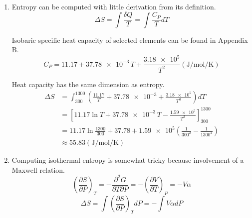 \begin{@empty}
\begin{problem}
\end{problem}

\begin{answer}
    \begin{enumerate}
        \item Entropy can be computed with little derivation from its
            definition.
            \[ \Delta S = \int \frac{\delta Q}{T} = \int \frac{C_P}{T} dT \]

            Isobaric specific heat capacity of selected elements can be found
            in Appendix B.
            \[ C_P = 11.17 + \num{37.78e-3}\,T + \frac{\num{3.18e5}}{T^2} \left( \si{\joule\per\mol\per\kelvin} \right) \]

            Heat capacity has the same dimension as entropy.
            \begin{align*}
                \Delta S &= \int_{300}^{1300} \left( \frac{11.17}{T} + \num{37.78e-3} + \frac{\num{3.18e5}}{T^3} \right) dT \\
                    &= \left[ 11.17 \ln T + \num{37.78e-3}\, T - \frac{\num{1.59e5}}{T^2} \right]_{300}^{1300} \\
                    &= 11.17 \ln \frac{1300}{300} + 37.78
                        + \num{1.59e5} \left( \frac{1}{300^2} - \frac{1}{1300^2} \right) \\
                    &\approx 55.83 \left( \si{\joule\per\mol\per\kelvin} \right)
            \end{align*}

        \item Computing isothermal entropy is somewhat tricky because
            involvement of a Maxwell relation.
            \[
                \left( \frac{\partial S}{\partial P} \right)_T
                = -\frac{\partial^2 G}{\partial T \partial P}
                = -\left( \frac{\partial V}{\partial T} \right)_P
                = -V \alpha
            \]
            \[ \Delta S = \int \left( \frac{\partial S}{\partial P} \right)_T dP = -\int V \alpha dP \]

            \begin{@empty}
                \newcommand{\stdT}{\SI{298}{\kelvin}}
                \newcommand{\stdP}{\SI{1}{\atm}}
                \newcommand{\thisa}{\SI{40e-6}{\per\kelvin}}
                \newcommand{\thisb}{\SI{26e-7}{\per\atm}}
                \newcommand{\thisVS}{\SI[per-mode=fraction]{6.60}{\cc\per\mol}}
                \newcommand{\exponent}{\num{80e-6} - \thisb \left( P - \stdP \right)}


\end{@empty}
\end{enumerate}
\end{answer}
\end{@empty}
